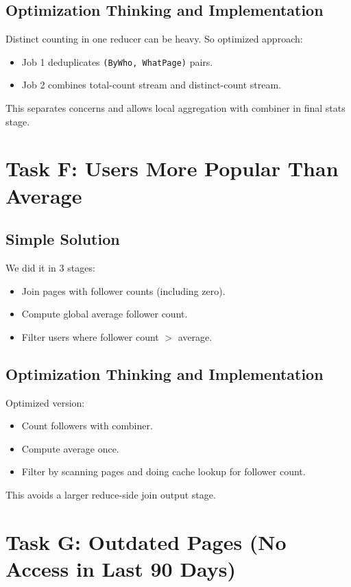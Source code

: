 \documentclass[11pt]{article}
\begin{document}
    \subsection*{Optimization Thinking and Implementation}
    Distinct counting in one reducer can be heavy.
    So optimized approach:
    \begin{itemize}
        \item Job 1 deduplicates \texttt{(ByWho, WhatPage)} pairs.
        \item Job 2 combines total-count stream and distinct-count stream.
    \end{itemize}
    This separates concerns and allows local aggregation with combiner in final stats stage.

    \section{Task F: Users More Popular Than Average}
    \subsection*{Simple Solution}
    We did it in 3 stages:
    \begin{itemize}
        \item Join pages with follower counts (including zero).
        \item Compute global average follower count.
        \item Filter users where follower count \(>\) average.
    \end{itemize}

    \subsection*{Optimization Thinking and Implementation}
    Optimized version:
    \begin{itemize}
        \item Count followers with combiner.
        \item Compute average once.
        \item Filter by scanning pages and doing cache lookup for follower count.
    \end{itemize}
    This avoids a larger reduce-side join output stage.

    \section{Task G: Outdated Pages (No Access in Last 90 Days)}
\end{document}
